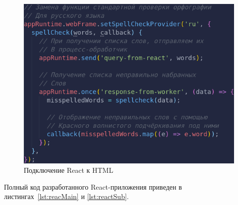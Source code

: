 \begin{figure}[H]
  \centering
  \includegraphics[height=0.2\textheight]{assets/images/practical/spellCheckProvider.png}
  \caption{Подключение React к HTML}
  \label{img:spellCheckProvider}
\end{figure}

Полный код разработанного React-приложения приведен в листингах~\ref{lst:reacMain} и \ref{lst:reactSub}.